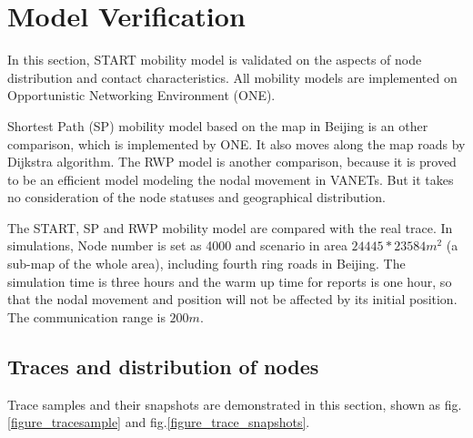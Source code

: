 \section{Model Verification}
\label{section_model_varification}
In this section, START mobility model is validated on the aspects of node distribution and contact characteristics. All mobility models are implemented on Opportunistic Networking Environment (ONE)\cite{KeranenOtt-155}.

Shortest Path (SP) mobility model based on the map in Beijing is an other comparison, which is implemented by ONE.  It also moves along the map roads by Dijkstra algorithm.
The RWP model is another comparison, because it is proved to be an efficient model modeling the nodal movement in VANETs. But it takes no consideration of the node statuses and geographical distribution.

The START, SP and RWP mobility model are compared with the real trace.
In simulations, Node number is set as 4000 and scenario in area $24445*23584 m^2$ (a sub-map of the whole area), including fourth ring roads in Beijing. The simulation time is three hours and the warm up time for reports is one hour, so that the nodal movement and position will not be affected by its initial position. The communication range is $200m$.

\subsection{Traces and distribution of nodes}

Trace samples and their snapshots are demonstrated in this section, shown as fig. \ref{figure_tracesample} and fig.\ref{figure_trace_snapshots}.




